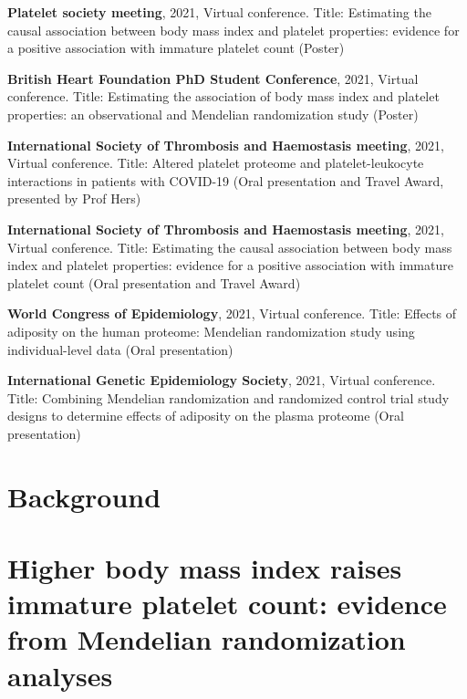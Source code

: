 \documentclass[11pt,twoside]{bristolthesis}
\begin{document}
\textbf{Platelet society meeting}, 2021, Virtual conference. Title: Estimating the causal association between body mass index and platelet properties: evidence for a positive association with immature platelet count (Poster)

\textbf{British Heart Foundation PhD Student Conference}, 2021, Virtual conference. Title: Estimating the association of body mass index and platelet properties: an observational and Mendelian randomization study (Poster)

\textbf{International Society of Thrombosis and Haemostasis meeting}, 2021, Virtual conference. Title: Altered platelet proteome and platelet-leukocyte interactions in patients with COVID-19 (Oral presentation and Travel Award, presented by Prof Hers)

\textbf{International Society of Thrombosis and Haemostasis meeting}, 2021, Virtual conference. Title: Estimating the causal association between body mass index and platelet properties: evidence for a positive association with immature platelet count (Oral presentation and Travel Award)

\textbf{World Congress of Epidemiology}, 2021, Virtual conference. Title: Effects of adiposity on the human proteome: Mendelian randomization study using individual-level data (Oral presentation)

\textbf{International Genetic Epidemiology Society}, 2021, Virtual conference. Title: Combining Mendelian randomization and randomized control trial study designs to determine effects of adiposity on the plasma proteome (Oral presentation)

\hypertarget{background-1}{%
\chapter*{Background}\label{background-1}}

\hypertarget{section}{%
\section{}\label{section}}

\hypertarget{higher-body-mass-index-raises-immature-platelet-count-evidence-from-mendelian-randomization-analyses}{%
\chapter{Higher body mass index raises immature platelet count: evidence from Mendelian randomization analyses}\label{higher-body-mass-index-raises-immature-platelet-count-evidence-from-mendelian-randomization-analyses}}
\end{document}
